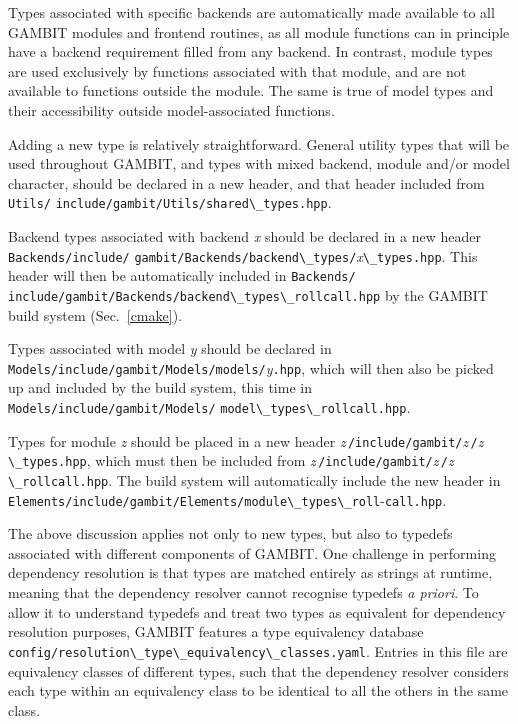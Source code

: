 \documentclass[pdftex,twocolumn,epjc3_preprint,runningheads]{svjour3}
\renewcommand{\_}{\discretionary{\underscore}{}{\underscore}}
\newcommand\term[1]{{\lstset{style=terminal}\lstinline!#1!\lstset{style=cpp}}}
\newcommand{\metavarf}[1]{\textit{\color{darkgreen}\footnotesize\textrm{#1}}}
\newcommand{\metavar}{\metavarf}
\newcommand{\gambit}{\textsf{GAMBIT}\xspace}
\newcommand{\GB}{\gambit}
\begin{document}
Types associated with specific backends are automatically made available to all \GB modules and frontend routines, as all module functions can in principle have a backend requirement filled from any backend.  In contrast, module types are used exclusively by functions associated with that module, and are not available to functions outside the module.  The same is true of model types and their accessibility outside model-associated functions.

Adding a new type is relatively straightforward.  General utility types that will be used throughout \GB, and types with mixed backend, module and/or model character, should be declared in a new header, and that header included from \term{Utils/} \term{include/gambit/Utils/shared\_types.hpp}.

Backend types associated with backend \metavar{x} should be declared in a new header \term{Backends/include/} \term{gambit/Backends/backend\_types/}\metavar{x}\term{\_types.hpp}.  This header will then be automatically included in \term{Backends/} \term{include/gambit/Backends/backend\_types\_rollcall.hpp} by the \GB build system (Sec.\ \ref{cmake}).

Types associated with model \metavar{y} should be declared in \term{Models/include/gambit/Models/models/}\metavar{y}\term{.hpp}, which will then also be picked up and included by the build system, this time in \term{Models/include/gambit/Models/} \term{model\_types\_rollcall.hpp}.

Types for module \metavar{z} should be placed in a new header \metavar{z}\,\term{/include}\term{/gambit/}\metavar{z}\,\term{/}\metavar{z}\,\term{\_types.hpp}, which must then be included from \mbox{\metavar{z}\,\term{/include/gambit/}\metavar{z}\,\term{/}\metavar{z}\,\term{\_rollcall.hpp}}. The build system will automatically include the new header in \term{Elements/include/gambit/Elements/module\_types}\term{\_roll}-\term{call.hpp}.

The above discussion applies not only to new types, but also to typedefs associated with different components of \GB.  One challenge in performing dependency resolution is that types are matched entirely as strings at runtime, meaning that the dependency resolver cannot recognise typedefs \emph{a priori}. To allow it to understand typedefs and treat two types as equivalent for dependency resolution purposes, \GB features a type equivalency database \term{config/resolution\_}\term{type\_equivalency\_}\mbox{\term{classes.yaml}.}  Entries in this file are equivalency classes of different types, such that the dependency resolver considers each type within an equivalency class to be identical to all the others in the same class.
\end{document}

